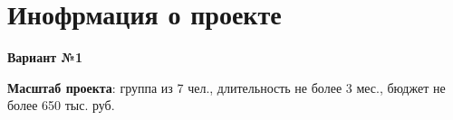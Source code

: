 \chapter{Инофрмация о проекте}

\textbf{Вариант №1}

\textbf{Масштаб проекта}: группа из 7 чел., длительность не более 3 мес., бюджет не более 650 тыс. руб. 

